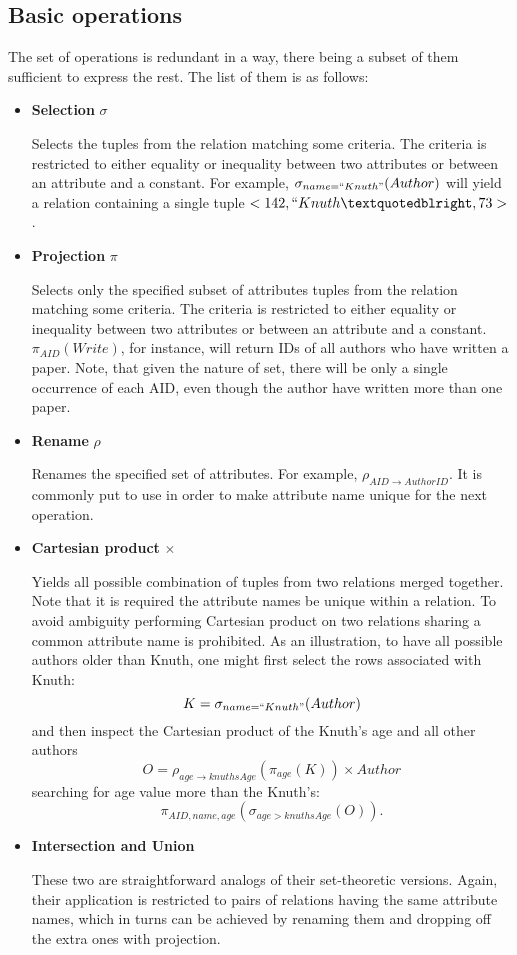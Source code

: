 \documentclass[12pt]{article}
\begin{document}
\subsection{Basic operations}
The set of operations is redundant in a way, there being a subset of them sufficient to express
the rest. The list of them is as follows:
\begin{itemize}  
\item \textbf{Selection} $\sigma$

Selects the tuples from the relation matching some criteria. The criteria
is restricted to either equality or inequality between two attributes or between an attribute and a constant.
For example, $\sigma_{name=``Knuth"}(Author)$ will yield a relation containing a single tuple ${<142, ``Knuth”, 73>}$.
 
\item \textbf{Projection} $\pi$

Selects only the specified subset of attributes tuples from the relation matching some criteria. The criteria
is restricted to either equality or inequality between two attributes or between an attribute and a constant.
$\pi_{AID}(Write)$, for instance, will return IDs of all authors who have written a paper. Note, that given the
nature of set, there will be only a single occurrence of each AID, even though the author have written more than one paper.

\item \textbf{Rename} $\rho$

Renames the specified set of attributes. For example, $\rho_{AID \rightarrow AuthorID}$.
It is commonly put to use in order to make attribute name unique for the next operation.

\item \textbf{Cartesian product} $\times$

Yields all possible combination of tuples from two relations merged together. Note that it is required 
the attribute names be unique within a relation. To avoid ambiguity performing Cartesian product on two relations
sharing a common attribute name is prohibited. As an illustration, to have all possible authors older than
Knuth, one might first select the rows associated with Knuth: $$K=\sigma_{name=``Knuth"}(Author)$$
and then inspect the Cartesian product of the Knuth's age and all other authors
$$O=\rho_{age \rightarrow knuthsAge}(\pi_{age}(K)) \times Author $$
searching for age value more than the Knuth's:
$$\pi_{AID,name,age}(\sigma_{age > knuthsAge}(O)).$$

\item \textbf{Intersection and Union}

These two are straightforward analogs of their set-theoretic versions. Again, their application is restricted to
pairs of relations having the same attribute names, which in turns can be achieved by renaming them and dropping
off the extra ones with projection.

\end{itemize}
\end{document}
